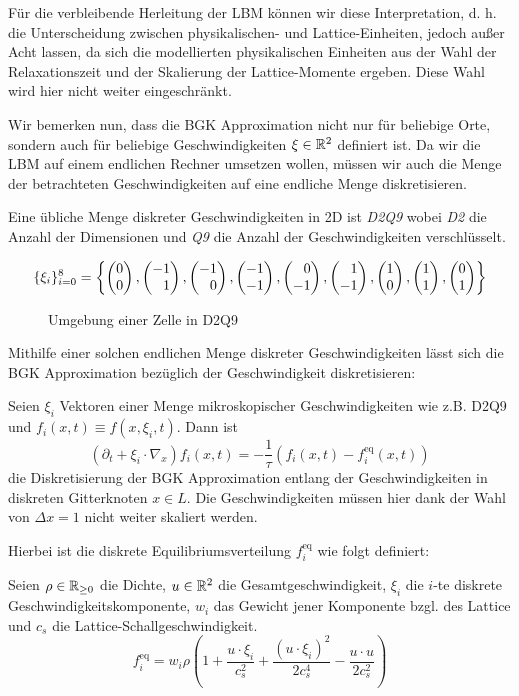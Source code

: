 Für die verbleibende Herleitung der LBM können wir diese Interpretation, d. h. die Unterscheidung zwischen physikalischen- und Lattice-Einheiten, jedoch außer Acht lassen, da sich die modellierten physikalischen Einheiten aus der Wahl der Relaxationszeit und der Skalierung der Lattice-Momente ergeben. Diese Wahl wird hier nicht weiter eingeschränkt.

\bigskip

Wir bemerken nun, dass die BGK Approximation nicht nur für beliebige Orte, sondern auch für beliebige Geschwindigkeiten \(\xi \in \mathbb{R}^2\) definiert ist. Da wir die LBM auf einem endlichen Rechner umsetzen wollen, müssen wir auch die Menge der betrachteten Geschwindigkeiten auf eine endliche Menge diskretisieren.

Eine übliche Menge diskreter Geschwindigkeiten in 2D ist \emph{D2Q9} wobei \emph{D2} die Anzahl der Dimensionen und \emph{Q9} die Anzahl der Geschwindigkeiten verschlüsselt.

\begin{Definition}[D2Q9 Modell]
\[ \{\xi_i\}_{i=0}^8 = \left\{ \begin{pmatrix}0\\0\end{pmatrix}, \begin{pmatrix}-1\\\phantom{-}1\end{pmatrix}, \begin{pmatrix}-1\\\phantom{-}0\end{pmatrix}, \begin{pmatrix}-1\\-1\end{pmatrix}, \begin{pmatrix}\phantom{-}0\\-1\end{pmatrix}, \begin{pmatrix}\phantom{-}1\\-1\end{pmatrix}, \begin{pmatrix}1\\0\end{pmatrix}, \begin{pmatrix}1\\1\end{pmatrix}, \begin{pmatrix}0\\1\end{pmatrix} \right\} \]
\end{Definition}

\begin{figure}
\centering

\caption{Umgebung einer Zelle in D2Q9}
\end{figure}

Mithilfe einer solchen endlichen Menge diskreter Geschwindigkeiten lässt sich die BGK Approximation bezüglich der Geschwindigkeit diskretisieren:

\begin{Definition}
\label{def:disVelBGK}
Seien \(\xi_i\) Vektoren einer Menge mikroskopischer Geschwindigkeiten wie z.B. D2Q9 und \(f_i(x,t) \equiv f(x,\xi_i,t)\). Dann ist
\[ (\partial_t + \xi_i \cdot \nabla_x) f_i(x,t) = -\frac{1}{\tau} (f_i(x,t) - f_i^\text{eq}(x,t)) \]
die Diskretisierung der BGK Approximation entlang der Geschwindigkeiten in diskreten Gitterknoten \(x \in L\). Die Geschwindigkeiten müssen hier dank der Wahl von \(\Delta x = 1\) nicht weiter skaliert werden.
\end{Definition}

Hierbei ist die diskrete Equilibriumsverteilung \(f_i^\text{eq}\) wie folgt definiert:

\begin{Definition}
\label{def:fieq}
Seien \(\rho \in \mathbb{R}_{\geq 0}\) die Dichte, \(u \in \mathbb{R}^2\) die Gesamtgeschwindigkeit, \(\xi_i\) die \(i\)-te diskrete Geschwindigkeitskomponente, \(w_i\) das Gewicht jener Komponente bzgl. des Lattice und \(c_s\) die Lattice-Schallgeschwindigkeit.
\[f_i^\text{eq} = w_i \rho \left( 1 + \frac{u \cdot \xi_i}{c_s^2} + \frac{(u \cdot \xi_i)^2}{2c_s^4} - \frac{u \cdot u}{2c_s^2} \right)\]
\end{Definition}

